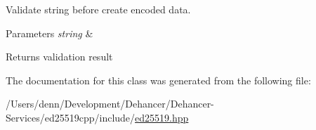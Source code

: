 Validate string before create encoded data. 
\begin{DoxyParams}{Parameters}
{\em string} & \\
\hline
\end{DoxyParams}
\begin{DoxyReturn}{Returns}
validation result 
\end{DoxyReturn}


The documentation for this class was generated from the following file\+:\begin{DoxyCompactItemize}
\item 
/\+Users/denn/\+Development/\+Dehancer/\+Dehancer-\/\+Services/ed25519cpp/include/\mbox{\hyperlink{ed25519_8hpp}{ed25519.\+hpp}}\end{DoxyCompactItemize}
